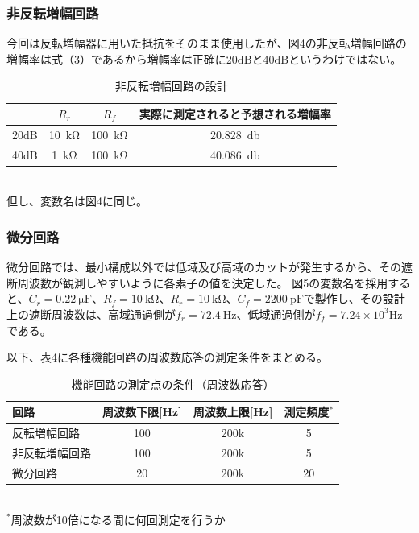 \documentclass[10pt,a4j,dvipdfmx]{jsarticle}
\begin{document}
\subsubsection{非反転増幅回路}
今回は反転増幅器に用いた抵抗をそのまま使用したが、図4の非反転増幅回路の増幅率は式（3）であるから増幅率は正確に20dBと40dBというわけではない。
\begin{table}[htb]
  \begin{center}
    \caption{非反転増幅回路の設計}
    \begin{tabular}{|l||c|c|c|} \hline
       & $R_r$ & $R_f$ & 実際に測定されると予想される増幅率\\ \hline \hline
      20dB & \SI{10}{\kilo\ohm} & \SI{100}{\kilo\ohm} &\SI{20.828}{\decibel}\\
      40dB & \SI{1}{\kilo\ohm} & \SI{100}{\kilo\ohm} &\SI{40.086}{\decibel}\\ \hline
    \end{tabular}
    \\但し、変数名は図4に同じ。
  \end{center}
\end{table}

\subsubsection{微分回路}
微分回路では、最小構成以外では低域及び高域のカットが発生するから、その遮断周波数が観測しやすいように各素子の値を決定した。
図5の変数名を採用すると、$C_r=\SI{0.22}{\micro\farad}$、$R_f=\SI{10}{\kilo\ohm}$、$R_r=\SI{10}{\kilo\ohm}$、$C_f=\SI{2200}{\pico\farad}$で製作し、その設計上の遮断周波数は、高域通過側が$f_r=\SI{72.4}{\hertz}$、低域通過側が$f_f=7.24\times10^{3}$\si{\hertz}である。

以下、表4に各種機能回路の周波数応答の測定条件をまとめる。
\begin{table}[H]
  \begin{center}
    \caption{機能回路の測定点の条件（周波数応答）}
    \begin{tabular}{|l||c|c|c|} \hline
      回路 & 周波数下限[\si{\hertz}] & 周波数上限[\si{\hertz}] & 測定頻度$^*$\\ \hline \hline
      反転増幅回路 & 100 & 200k & 5\\
      非反転増幅回路 & 100 & 200k & 5 \\ 
      微分回路 & 20 & 200k & 20 \\ 
      \hline
    \end{tabular}
    \\ $^*$周波数が10倍になる間に何回測定を行うか
  \end{center}
\end{table}
\end{document}
